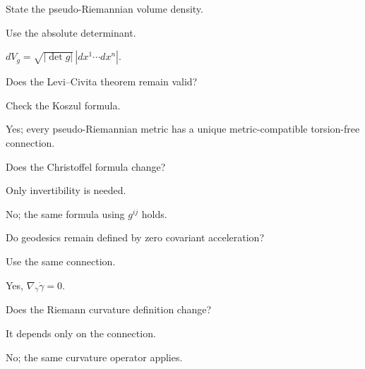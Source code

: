 \begin{exercise}\label{exr:vii29-16}
State the pseudo-Riemannian volume density.
\end{exercise}
\begin{hint}
Use the absolute determinant.
\end{hint}
\begin{solution}
\(dV_g=\sqrt{|\det g|}\,|dx^1\cdots dx^n|\).
\end{solution}

\begin{exercise}\label{exr:vii29-17}
Does the Levi--Civita theorem remain valid?
\end{exercise}
\begin{hint}
Check the Koszul formula.
\end{hint}
\begin{solution}
Yes; every pseudo-Riemannian metric has a unique metric-compatible torsion-free connection.
\end{solution}

\begin{exercise}\label{exr:vii29-18}
Does the Christoffel formula change?
\end{exercise}
\begin{hint}
Only invertibility is needed.
\end{hint}
\begin{solution}
No; the same formula using \(g^{ij}\) holds.
\end{solution}

\begin{exercise}\label{exr:vii29-19}
Do geodesics remain defined by zero covariant acceleration?
\end{exercise}
\begin{hint}
Use the same connection.
\end{hint}
\begin{solution}
Yes, \(\nabla_{\dot\gamma}\dot\gamma=0\).
\end{solution}

\begin{exercise}\label{exr:vii29-20}
Does the Riemann curvature definition change?
\end{exercise}
\begin{hint}
It depends only on the connection.
\end{hint}
\begin{solution}
No; the same curvature operator applies.
\end{solution}


